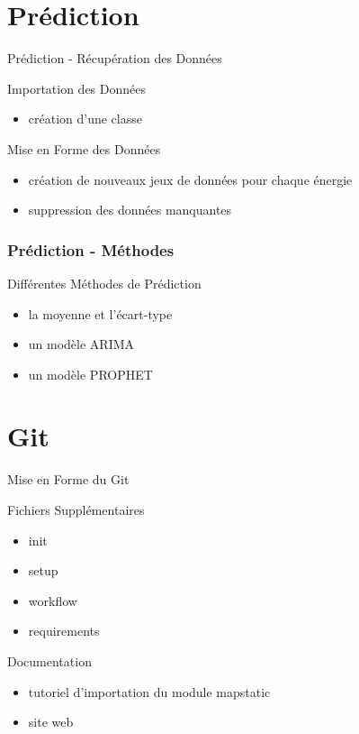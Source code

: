\documentclass{beamer}
\begin{document}
\section{Prédiction}
\begin{frame}{Prédiction - Récupération des Données}
\begin{block}{Importation des Données}
\begin{itemize}
    \item création d'une classe
\end{itemize}
\end{block}
\begin{block}{Mise en Forme des Données}
\begin{itemize}
    \item création de nouveaux jeux de données pour chaque énergie
    \item suppression des données manquantes
\end{itemize}
\end{block}
\end{frame}

\begin{frame}
\frametitle{Prédiction - Méthodes}
\begin{block}{Différentes Méthodes de Prédiction}
  \begin{itemize}
    \item la moyenne et l'écart-type
    \item un modèle ARIMA
    \item un modèle PROPHET
\end{itemize} 
\end{block}
\end{frame}

\section{Git}
\begin{frame}{Mise en Forme du Git}
\begin{block}{Fichiers Supplémentaires}
    \begin{itemize}
    \item init
    \item setup
    \item workflow
    \item requirements
\end{itemize}
\end{block}
\begin{block}{Documentation}
\begin{itemize}
    \item tutoriel d'importation du module mapstatic
    \item site web
\end{itemize}
\end{block}
\end{frame}
\end{document}
